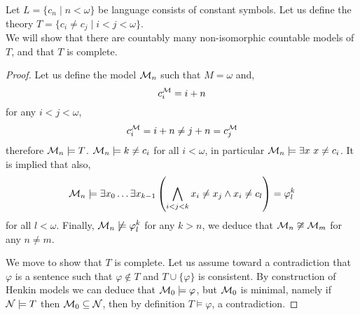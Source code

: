\question{}
Let $L = \{ c_n \mid n < \omega \}$ be language consists of constant symbols.
Let us define the theory $T = \{ c_i \ne c_j \mid i < j < \omega \}$. \\
We will show that there are countably many non-isomorphic countable models of $T$, and that $T$ is complete.
\begin{proof}
	Let us define the model $\mathcal{M}_n$ such that $M = \omega$ and,
	\[
		c_i^{\mathcal{M}} = i + n
	\]
	for any $i < j < \omega$,
	\[
		c_i^{\mathcal{M}}
		= i + n
		\ne j + n
		= c_j^{\mathcal{M}}
	\]
	therefore $\mathcal{M}_n \models T$.
	$\mathcal{M}_n \models k \ne c_i$ for all $i < \omega$, in particular $\mathcal{M}_n \models \exists x\ x \ne c_i$.
	It is implied that also,
	\[
		\mathcal{M}_n
		\models \exists x_0 \ldots \exists x_{k - 1} \left( \bigwedge_{i < j < k} x_i \ne x_j \land x_i \ne c_l \right)
		= \varphi_l^k
	\]
	for all $l < \omega$.
	Finally, $\mathcal{M}_n \not\models \varphi_l^k$ for any $k > n$, we deduce that $\mathcal{M}_n \not\cong \mathcal{M}_m$ for any $n \ne m$.

	We move to show that $T$ is complete.
	Let us assume toward a contradiction that $\varphi$ is a sentence such that $\varphi \notin T$ and $T \cup \{ \varphi \}$ is consistent.
	By construction of Henkin models we can deduce that $\mathcal{M}_0 \models \varphi$, but $\mathcal{M}_0$ is minimal, namely if $\mathcal{N} \models T$ then $\mathcal{M}_0 \subseteq \mathcal{N}$,
	then by definition $T \models \varphi$, a contradiction.
\end{proof}

